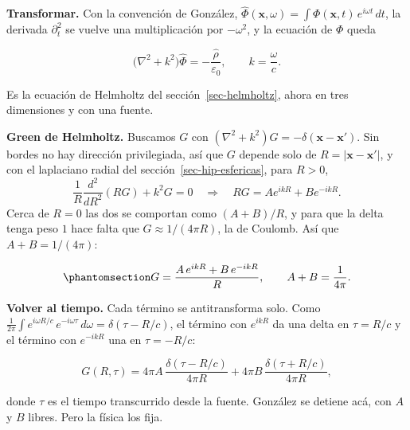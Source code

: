 \documentclass[
  spanish,
  a4paper,
]{scrbook}
\theoremstyle{definition}
\theoremstyle{plain}
\theoremstyle{definition}
\theoremstyle{plain}
\theoremstyle{definition}
\theoremstyle{remark}
\begin{document}
\textbf{Transformar.} Con la convención de González,
\(\hat\Phi(\mathbf x,\omega) = \int\Phi(\mathbf x,t)\,e^{i\omega t}\,dt\),
la derivada \(\partial_t^2\) se vuelve una multiplicación por
\(-\omega^2\), y la ecuación de \(\Phi\) queda

\[
\big(\nabla^2 + k^2\big)\hat\Phi = -\frac{\hat\rho}{\varepsilon_0}, \qquad k = \frac{\omega}{c}.
\]

Es la ecuación de Helmholtz del sección~\ref{sec-helmholtz}, ahora en
tres dimensiones y con una fuente.

\textbf{Green de Helmholtz.} Buscamos \(G\) con
\((\nabla^2+k^2)G = -\delta(\mathbf x-\mathbf x')\). Sin bordes no hay
dirección privilegiada, así que \(G\) depende solo de
\(R = |\mathbf x-\mathbf x'|\), y con el laplaciano radial del
sección~\ref{sec-hip-esfericas}, para \(R>0\), \[
\frac1R\frac{d^2}{dR^2}(RG) + k^2G = 0 \quad\Longrightarrow\quad RG = Ae^{ikR} + Be^{-ikR}.
\] Cerca de \(R = 0\) las dos se comportan como \((A+B)/R\), y para que
la delta tenga peso \(1\) hace falta que \(G\approx1/(4\pi R)\), la de
Coulomb. Así que \(A + B = 1/(4\pi)\):

\begin{equation}\protect\phantomsection\label{eq-hip-green-helmholtz}{
G = \frac{A\,e^{ikR} + B\,e^{-ikR}}{R}, \qquad A+B = \frac{1}{4\pi}.
}\end{equation}

\textbf{Volver al tiempo.} Cada término se antitransforma solo. Como
\(\tfrac{1}{2\pi}\int e^{i\omega R/c}\,e^{-i\omega\tau}\,d\omega = \delta(\tau - R/c)\),
el término con \(e^{ikR}\) da una delta en \(\tau = R/c\) y el término
con \(e^{-ikR}\) una en \(\tau = -R/c\):

\[
G(R,\tau) = 4\pi A\,\frac{\delta(\tau - R/c)}{4\pi R} + 4\pi B\,\frac{\delta(\tau + R/c)}{4\pi R},
\]

donde \(\tau\) es el tiempo transcurrido desde la fuente. González se
detiene acá, con \(A\) y \(B\) libres. Pero la física los fija.
\end{document}
